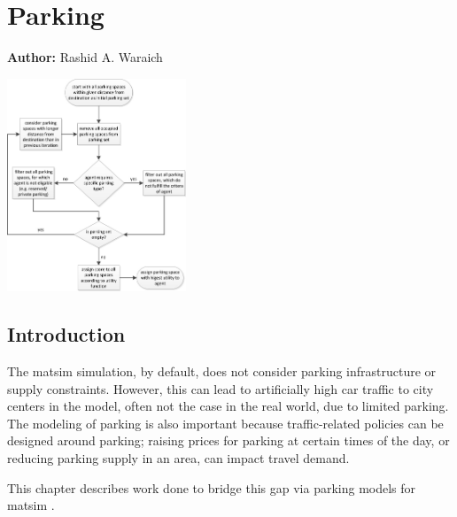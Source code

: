 \chapter{Parking}
\label{ch:parking}

\hfill \textbf{Author:} Rashid A. Waraich

\begin{center} \includegraphics[width=0.4\textwidth, angle=0]{extending/figures/Parking/parking_algo.png} \end{center}



\section{Introduction} 
The \gls{matsim} simulation, by default, does not consider parking infrastructure or supply constraints. However, this can lead to artificially high car traffic to city centers in the model, often not the case in the real world, due to limited parking. The modeling of parking is also important because traffic-related policies can be designed around parking; \eg raising  prices for parking at certain times of the day, or reducing parking supply in an area, can impact travel demand. 

This chapter describes work done to bridge this gap via parking models for \gls{matsim} .

